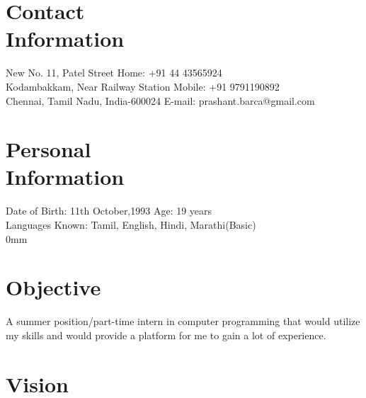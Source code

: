 \documentclass[margin,line]{resume}
\begin{document}
\begin{resume}

    \section{\mysidestyle Contact\\Information}

    New No. 11, Patel Street                            \hfill Home: +91 44 43565924          \vspace{0mm}\\\vspace{0mm}%
    Kodambakkam, Near Railway Station                          \hfill Mobile: +91 9791190892          \vspace{0mm}\\\vspace{0mm}%
    Chennai, Tamil Nadu, India-600024      \hfill E-mail: prashant.barca@gmail.com  \vspace{0mm}\\\vspace{-4.5mm}%

	\section{\mysidestyle Personal\\Information}

Date of Birth: 11th October,1993      \hfill Age: 19 years \vspace{0mm}\\\vspace{0mm}%
Languages Known: Tamil, English, Hindi, Marathi(Basic) \vspace{0mm}\\\vspace
{0mm}%
    \section{\mysidestyle Objective}

A summer position/part-time intern in computer programming that would utilize my skills and would provide a platform for me to gain a lot of experience. 
    \section{\mysidestyle Vision}


\end{resume}
\end{document}
